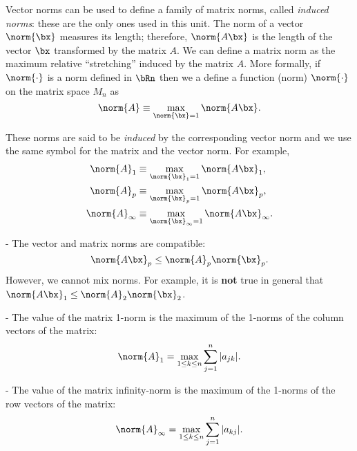 \smallskip

Vector norms can be used to define a family of matrix norms, called
\textit{induced norms}: these are the only ones used in this unit. The norm
of a vector $\norm{ \bx }$ measures its length; therefore, $\norm{ A \bx }$
is the length of the vector $\bx$ transformed by the matrix $A$.  We
can define a matrix norm as the maximum relative ``stretching''
induced by the matrix $A$.  More formally, if $\norm{ \cdot }$ is a norm
defined in $\bRn$ then we a define a function (norm) $\norm{ \cdot }$ on
the matrix space $M_n$ as
%
\begin{equation*}
\norm{ A } \equiv \max_{\norm{ \bx } = 1} \norm{ A \bx } .
\end{equation*}


\smallskip

These norms are said to be \textit{induced} by the corresponding
vector norm and we use the same symbol for the matrix and the vector
norm.   For example,
%
\begin{align*}
  \norm{ A }_1 & \equiv \max_{\norm{ \bx }_1 = 1} \norm{ A \bx }_1 , \\
  \norm{ A }_p & \equiv \max_{\norm{ \bx }_p = 1} \norm{ A \bx }_p , \\
  \norm{ A }_\infty & \equiv \max_{\norm{ \bx }_\infty = 1} \norm{ A \bx }_\infty .
\end{align*}
%
\smallskip

 - The vector and matrix norms are compatible:
%
\begin{equation*}
  \norm{ A \bx }_p \le \norm{ A }_p \norm{ \bx }_p .
\end{equation*}
%
However, we cannot mix norms.  For example, it is \textbf{not} true in
general that $\norm{ A \bx }_1 \le \norm{ A }_2 \norm{ \bx }_2$.

\smallskip

 - The value of the matrix 1-norm is the
maximum of the 1-norms of the column vectors of the matrix:
%
\begin{equation*}
 \norm{ A }_1 = \max_{1 \le k \le n} \sum_{j=1}^n | a_{j k} | .
\end{equation*}
%

\smallskip

 - The value of the matrix infinity-norm is
the maximum of the 1-norms of the row vectors of the matrix:
%
\begin{equation*}
  \norm{ A }_\infty = \max_{1 \le k \le n} \sum_{j=1}^n | a_{k j} | .
\end{equation*}

